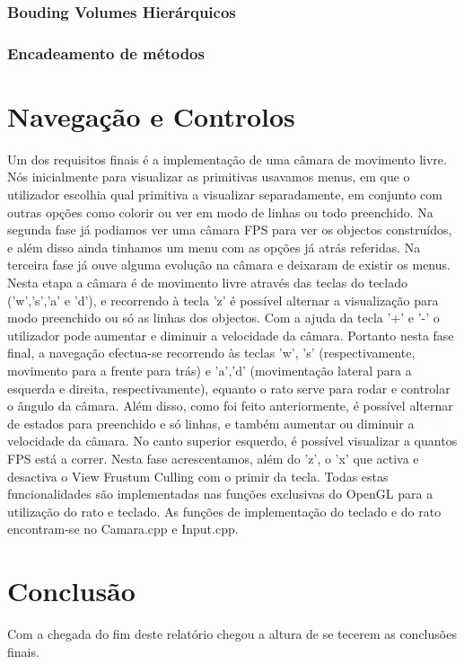 \documentclass[a5paper,onecolumn, 11pt]{article}
\begin{document}
\subsubsection{Bouding Volumes Hierárquicos} \label{bounding volumes hierarquicos}
\subsubsection{Encadeamento de métodos}

\newpage
\section{Navegação e Controlos}
Um dos requisitos finais é a implementação de uma câmara de movimento livre. Nós inicialmente para visualizar as primitivas usavamos menus, em que o utilizador escolhia qual primitiva a visualizar separadamente, em conjunto com outras opções como colorir ou ver em modo de linhas ou todo preenchido. Na segunda fase já podiamos ver uma câmara FPS para ver os objectos construídos, e além disso ainda tinhamos um menu com as opções já atrás referidas. Na terceira fase já ouve alguma evolução na câmara e deixaram de existir os menus. Nesta etapa a câmara é de movimento livre através das teclas do teclado ('w','s','a' e 'd'), e recorrendo à tecla 'z' é possível alternar a visualização para modo preenchido ou só as linhas dos objectos. Com a ajuda da tecla '+' e '-' o utilizador pode aumentar e diminuir a velocidade da câmara. Portanto nesta fase final, a navegação efectua-se recorrendo às teclas 'w', 's' (respectivamente, movimento para a frente para trás) e 'a','d' (movimentação lateral para a esquerda e direita, respectivamente), equanto o rato serve para rodar e controlar o ângulo da câmara. Além disso, como foi feito anteriormente, é possível alternar de estados para preenchido e só linhas, e também aumentar ou diminuir a velocidade da câmara. No canto superior esquerdo, é possível visualizar a quantos FPS está a correr. Nesta fase acrescentamos, além do 'z', o 'x' que activa e desactiva o View Frustum Culling com o primir da tecla.
Todas estas funcionalidades são implementadas nas funções exclusivas do OpenGL para a utilização do rato e teclado. As funções de implementação do teclado e do rato encontram-se no Camara.cpp e Input.cpp.
\clearpage
\section{Conclusão}
Com a chegada do fim deste relatório chegou a altura de se tecerem as conclusões finais.
\newpage
\end{document}
